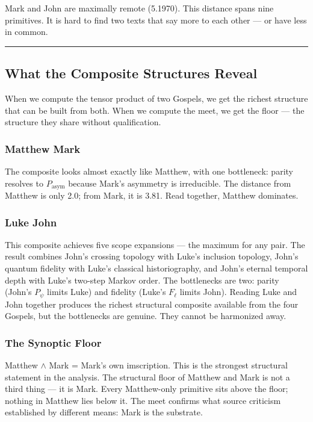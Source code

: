 \documentclass[12pt,a4paper]{article}
\begin{document}
Mark and John are maximally remote (5.1970). This distance spans nine primitives. It is hard to find two texts that say more to each other --- or have less in common.

\begin{center}
\rule{0.5\textwidth}{0.4pt}
\end{center}

\subsection{What the Composite Structures Reveal}

When we compute the tensor product of two Gospels, we get the richest structure that can be built from both. When we compute the meet, we get the floor --- the structure they share without qualification.

\subsubsection{Matthew \otimes Mark}

The composite looks almost exactly like Matthew, with one bottleneck: parity resolves to $P_\text{asym}$ because Mark's asymmetry is irreducible. The distance from Matthew is only 2.0; from Mark, it is 3.81. Read together, Matthew dominates.

\subsubsection{Luke \otimes John}

This composite achieves five scope expansions --- the maximum for any pair. The result combines John's crossing topology with Luke's inclusion topology, John's quantum fidelity with Luke's classical historiography, and John's eternal temporal depth with Luke's two-step Markov order. The bottlenecks are two: parity (John's $P_{\psi}$ limits Luke) and fidelity (Luke's $F_{\ell}$ limits John). Reading Luke and John together produces the richest structural composite available from the four Gospels, but the bottlenecks are genuine. They cannot be harmonized away.

\subsubsection{The Synoptic Floor}

Matthew $\land$ Mark = Mark's own imscription. This is the strongest structural statement in the analysis. The structural floor of Matthew and Mark is not a third thing --- it is Mark. Every Matthew-only primitive sits above the floor; nothing in Matthew lies below it. The meet confirms what source criticism established by different means: Mark is the substrate.
\end{document}
